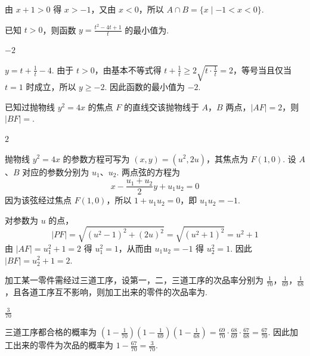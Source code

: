\begin{solution}
由 \(x+1>0\) 得 \(x>-1\)，又由 \(x<0\)，所以 \(A\cap B=\{x\mid -1<x<0\}\).
\end{solution}

\begin{problem}
已知 \(t > 0\)，则函数 \(y = \frac{t^2 - 4t + 1}{t}\) 的最小值为\fillinblank{}.
\end{problem}

\begin{answer}
\(-2\)
\end{answer}

\begin{solution}
\(y=t+\frac{1}{t}-4\). 由于 \(t>0\)，由基本不等式得 \(t+\frac{1}{t}\geq2\sqrt{t\cdot\frac{1}{t}}=2\)，等号当且仅当 \(t=1\) 时成立，所以 \(y\geq-2\). 因此函数的最小值为 \(-2\).
\end{solution}

\begin{problem}
已知过抛物线 \( y^{2} = 4x \) 的焦点 \(F\) 的直线交该抛物线于 \(A\)，\(B\) 两点，\( |AF| = 2 \)，则 \( |BF| = \)\fillinblank{}.
\end{problem}

\begin{answer}
\(2\)
\end{answer}

\begin{solution}
抛物线 \(y^2=4x\) 的参数方程可写为 \((x,y)=(u^2,2u)\)，其焦点为 \(F(1,0)\). 设 \(A\)、\(B\) 对应的参数分别为 \(u_1\)、\(u_2\). 两点弦的方程为
\[
x-\frac{u_1+u_2}{2}y+u_1u_2=0
\]
因为该弦经过焦点 \(F(1,0)\)，所以 \(1+u_1u_2=0\)，即 \(u_1u_2=-1\).

对参数为 \(u\) 的点，
\[
|PF|=\sqrt{(u^2-1)^2+(2u)^2}=\sqrt{(u^2+1)^2}=u^2+1
\]
由 \(|AF|=u_1^2+1=2\) 得 \(u_1^2=1\)，从而由 \(u_1u_2=-1\) 得 \(u_2^2=1\). 因此 \(|BF|=u_2^2+1=2\).
\end{solution}

\begin{problem}
加工某一零件需经过三道工序，设第一，二，三道工序的次品率分别为 \(\frac{1}{70}\)，\(\frac{1}{69}\)，\(\frac{1}{68}\)，且各道工序互不影响，则加工出来的零件的次品率为\fillinblank{}.
\end{problem}

\begin{answer}
\(\frac{3}{70}\)
\end{answer}

\begin{solution}
三道工序都合格的概率为 \(\left(1-\frac{1}{70}\right)\left(1-\frac{1}{69}\right)\left(1-\frac{1}{68}\right)=\frac{69}{70}\cdot\frac{68}{69}\cdot\frac{67}{68}=\frac{67}{70}\). 因此加工出来的零件为次品的概率为 \(1-\frac{67}{70}=\frac{3}{70}\).
\end{solution}


